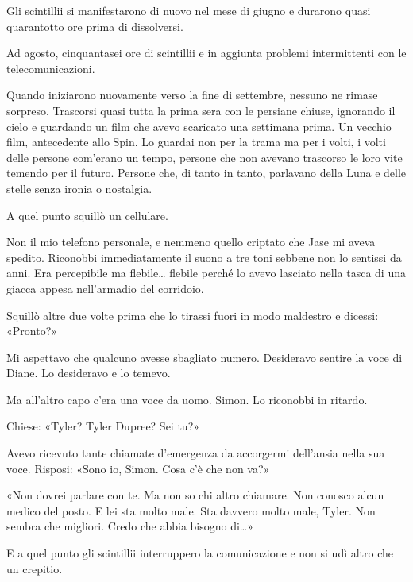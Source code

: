 Gli scintillii si manifestarono di nuovo nel mese di giugno e durarono
quasi quarantotto ore prima di dissolversi.

Ad agosto, cinquantasei ore di scintillii e in aggiunta problemi
intermittenti con le telecomunicazioni.

Quando iniziarono nuovamente verso la fine di settembre, nessuno ne
rimase sorpreso. Trascorsi quasi tutta la prima sera con le persiane
chiuse, ignorando il cielo e guardando un film che avevo scaricato una
settimana prima. Un vecchio film, antecedente allo Spin. Lo guardai non
per la trama ma per i volti, i volti delle persone com'erano un tempo,
persone che non avevano trascorso le loro vite temendo per il futuro.
Persone che, di tanto in tanto, parlavano della Luna e delle stelle
senza ironia o nostalgia.

A quel punto squillò un cellulare.

Non il mio telefono personale, e nemmeno quello criptato che Jase mi
aveva spedito. Riconobbi immediatamente il suono a tre toni sebbene non
lo sentissi da anni. Era percepibile ma flebile\ldots{} flebile perché
lo avevo lasciato nella tasca di una giacca appesa nell'armadio del
corridoio.

Squillò altre due volte prima che lo tirassi fuori in modo maldestro e
dicessi: «Pronto?»

Mi aspettavo che qualcuno avesse sbagliato numero. Desideravo sentire la
voce di Diane. Lo desideravo e lo temevo.

Ma all'altro capo c'era una voce da uomo. Simon. Lo riconobbi in
ritardo.

Chiese: «Tyler? Tyler Dupree? Sei tu?»

Avevo ricevuto tante chiamate d'emergenza da accorgermi dell'ansia nella
sua voce. Risposi: «Sono io, Simon. Cosa c'è che non va?»

«Non dovrei parlare con te. Ma non so chi altro chiamare. Non conosco
alcun medico del posto. E lei sta molto male. Sta davvero molto male,
Tyler. Non sembra che migliori. Credo che abbia bisogno di\ldots»

E a quel punto gli scintillii interruppero la comunicazione e non si udì
altro che un crepitio.